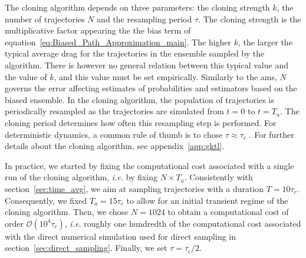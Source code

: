 The cloning algorithm depends on three parameters: the cloning strength $k$, the number of trajectories $N$ and the resampling period $\tau$.
The cloning strength is the multiplicative factor appearing the the bias term of equation~\eqref{eq:Biased_Path_Approximation_main}.
The higher $k$, the larger the typical average drag for the trajectories in the ensemble sampled by the algorithm.
There is however no general relation between this typical value and the value of $k$, and this value must be set empirically.
Similarly to the \ac{ams}, $N$ governs the error affecting estimates of probabilities and estimators based on the biased ensemble.
In the cloning algorithm, the population of trajectories is periodically resampled as the trajectories are simulated from $t=0$ to
$t=T_a$.
The cloning period determines how often this resampling step is performed.
For deterministic dynamics, a common rule of thumb is to chose $\tau \approx \tau_c$ \citep{giardina_direct_2006}.
For further details about the cloning algorithm, see appendix~\ref{app:gktl}.

In practice, we started by fixing the computational cost associated with a single run of the cloning algorithm, \textit{i.e.} by fixing $N \times T_a$.
Consistently with section~\ref{sec:time_avg}, we aim at sampling trajectories with a duration $T = 10\tau_c$.
Consequently, we fixed $T_a = 15\tau_c$ to allow for an initial transient regime of the cloning algorithm.
Then, we chose $N = 1024$ to obtain a computational cost of order $\mathcal{O}(10^4 \tau_c)$, \textit{i.e.} roughly one hundredth of the computational cost associated with the direct numerical simulation used for direct sampling in section~\ref{sec:direct_sampling}.
Finally, we set $\tau = \tau_c / 2$.

